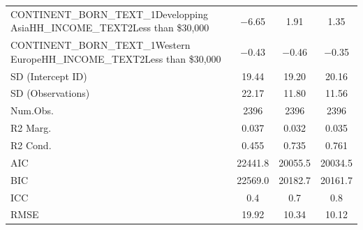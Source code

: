 \documentclass[]{report}
\begin{document}
\begin{table}
{\begin{tabular}[t]{lccc}
		CONTINENT\_BORN\_TEXT\_1Developping AsiaHH\_INCOME\_TEXT2Less than \$30,000 & \num{-6.65} & \num{1.91} & \num{1.35}\\
		CONTINENT\_BORN\_TEXT\_1Western EuropeHH\_INCOME\_TEXT2Less than \$30,000 & \num{-0.43} & \num{-0.46} & \num{-0.35}\\
		SD (Intercept ID) & \num{19.44} & \num{19.20} & \num{20.16}\\
		SD (Observations) & \num{22.17} & \num{11.80} & \num{11.56}\\
		\midrule
		Num.Obs. & \num{2396} & \num{2396} & \num{2396}\\
		R2 Marg. & \num{0.037} & \num{0.032} & \num{0.035}\\
		R2 Cond. & \num{0.455} & \num{0.735} & \num{0.761}\\
		AIC & \num{22441.8} & \num{20055.5} & \num{20034.5}\\
		BIC & \num{22569.0} & \num{20182.7} & \num{20161.7}\\
		ICC & \num{0.4} & \num{0.7} & \num{0.8}\\
		RMSE & \num{19.92} & \num{10.34} & \num{10.12}\\
		\bottomrule
	\end{tabular}}
\end{table}
\end{document}
